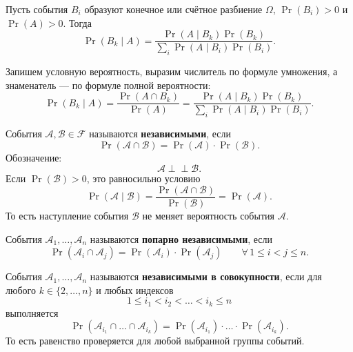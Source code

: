 \begin{theorem}
Пусть события $B_i$ образуют конечное или счётное разбиение $\Omega$, $\Pr(B_i)>0$ и $\Pr(A)>0$. Тогда
\[
 \Pr(B_k\mid A)=\frac{\Pr(A\mid B_k)\Pr(B_k)}
                        {\sum_i \Pr(A\mid B_i)\Pr(B_i)}.
\]
\end{theorem}
\begin{Proof}
Запишем условную вероятность, выразим числитель по формуле умножения, а знаменатель — по формуле полной вероятности:
\[
 \Pr(B_k\mid A)=\frac{\Pr(A\cap B_k)}{\Pr(A)}
 =\frac{\Pr(A\mid B_k)\Pr(B_k)}{\sum_i\Pr(A\mid B_i)\Pr(B_i)}.
\]
\end{Proof}


\begin{definition}
    События $\mathcal{A}, \mathcal{B} \in \mathcal{F}$
    называются \textbf{независимыми}, если
    \[
        \Pr(\mathcal{A} \cap \mathcal{B})
        =
        \Pr(\mathcal{A}) \cdot \Pr(\mathcal{B}).
    \]
    Обозначение:
    \[
        \mathcal{A} \perp\!\!\!\perp \mathcal{B}.
    \]
    Если $\Pr(\mathcal{B}) > 0$, это равносильно условию
    \[
        \Pr(\mathcal{A} \mid \mathcal{B})
        =
        \frac{\Pr(\mathcal{A} \cap \mathcal{B})}{\Pr(\mathcal{B})}
        =
        \Pr(\mathcal{A}).
    \]
    То есть наступление события $\mathcal{B}$ не меняет
    вероятность события $\mathcal{A}$.
\end{definition}

\begin{definition}
    События $\mathcal{A}_1,\dots,\mathcal{A}_n$
    называются \textbf{попарно независимыми}, если
    \[
        \Pr(\mathcal{A}_i \cap \mathcal{A}_j)
        =
        \Pr(\mathcal{A}_i)\cdot\Pr(\mathcal{A}_j)
        \qquad
        \forall\,1 \leq i < j \leq n.
    \]
\end{definition}

\begin{definition}
    События $\mathcal{A}_1,\dots,\mathcal{A}_n$
    называются \textbf{независимыми в совокупности}, если
    для любого $k \in \{2,\dots,n\}$ и любых индексов
    \[
        1 \leq i_1 < i_2 < \dots < i_k \leq n
    \]
    выполняется
    \[
        \Pr(\mathcal{A}_{i_1} \cap \dots \cap \mathcal{A}_{i_k})
        =
        \Pr(\mathcal{A}_{i_1})\cdot\ldots\cdot
        \Pr(\mathcal{A}_{i_k}).
    \]
    То есть равенство проверяется для любой выбранной группы событий.
\end{definition}

